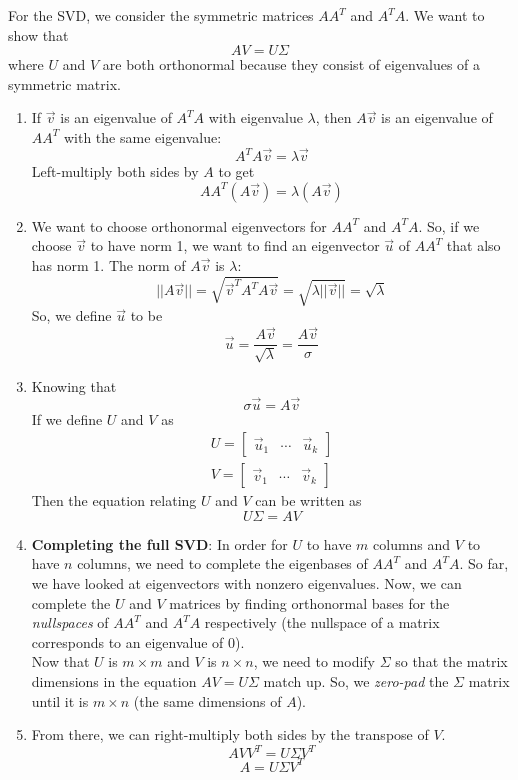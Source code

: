 \newline
For the SVD, we consider the symmetric matrices $AA^T$ and $A^T A$. We want to show that
$$AV = U\Sigma$$
where $U$ and $V$ are both orthonormal because they consist of eigenvalues of a symmetric matrix.
\begin{enumerate}
    \item If $\vec{v}$ is an eigenvalue of $A^T A$ with eigenvalue $\lambda$, then $A\vec{v}$ is an eigenvalue of $AA^T$ with the same eigenvalue:
    $$A^T A \vec{v} = \lambda \vec{v}$$
    Left-multiply both sides by $A$ to get
    $$A A^T (A \vec{v}) = \lambda (A \vec{v})$$
    \item We want to choose orthonormal eigenvectors for $AA^T$ and $A^T A$. 
    So, if we choose $\vec{v}$ to have norm 1, we want to find an eigenvector $\vec{u}$ of $AA^T$ that also has norm 1. 
    The norm of $A \vec{v}$ is $\lambda$:
    $$||A\vec{v}|| = \sqrt{\vec{v}^T A^T A \vec{v}} = \sqrt{\lambda ||\vec{v}||} = \sqrt{\lambda}$$
    So, we define $\vec{u}$ to be
    $$\vec{u} = \frac{A \vec{v}}{\sqrt{\lambda}} = \frac{A \vec{v}}{\sigma}$$
    \item Knowing that 
    $$\sigma \vec{u} = A \vec{v}$$
    If we define $U$ and $V$ as
    \begin{align*}
        U = \begin{bmatrix} \vec{u}_1 & \cdots & \vec{u}_k \end{bmatrix} \\
        V = \begin{bmatrix} \vec{v}_1 & \cdots & \vec{v}_k \end{bmatrix}
    \end{align*}
    Then the equation relating $U$ and $V$ can be written as
    $$U\Sigma = AV$$
    \item \textbf{Completing the full SVD}: In order for $U$ to have $m$ columns and $V$ to have $n$ columns, we need to complete the eigenbases of $AA^T$ and $A^TA$. So far, we have looked at eigenvectors with nonzero eigenvalues. Now, we can complete the $U$ and $V$ matrices by finding orthonormal bases for the \textit{nullspaces} of $AA^T$ and $A^TA$ respectively (the nullspace of a matrix corresponds to an eigenvalue of 0). \\
    \newline
    Now that $U$ is $m \times m$ and $V$ is $n \times n$, we need to modify $\Sigma$ so that the matrix dimensions in the equation $AV = U\Sigma$ match up.
    So, we \textit{zero-pad} the $\Sigma$ matrix until it is $m \times n$ (the same dimensions of $A$).

    \item From there, we can right-multiply both sides by the transpose of $V$. 
    $$AVV^T = U \Sigma V^T$$
    $$A = U \Sigma V^T$$
\end{enumerate}

